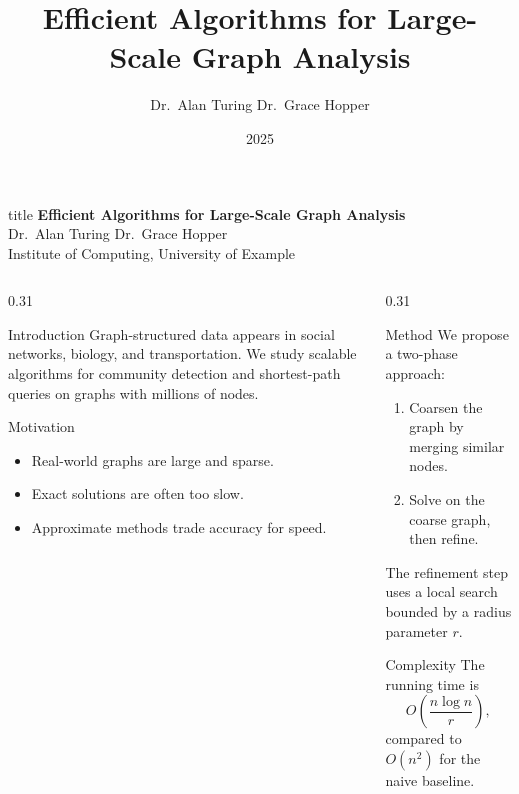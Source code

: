 \documentclass[final]{beamer}
\title{Efficient Algorithms for Large-Scale Graph Analysis}
\author{Dr.~Alan Turing \quad Dr.~Grace Hopper}
\institute{Institute of Computing, University of Example}
\date{2025}
\newcommand{\veryhuge}{\fontsize{60}{72}\selectfont}
\begin{document}
\begin{frame}[t]

\begin{beamercolorbox}[wd=\paperwidth, sep=1cm, center]{title}
  {\veryhuge\textbf{Efficient Algorithms for Large-Scale Graph Analysis}}\\[0.5cm]
  {\large Dr.~Alan Turing \quad Dr.~Grace Hopper}\\[0.2cm]
  {\normalsize Institute of Computing, University of Example \quad\textbar{}}
\end{beamercolorbox}
\vspace{1cm}

\begin{columns}[t]

\begin{column}{0.31\paperwidth}
  \begin{block}{Introduction}
    Graph-structured data appears in social networks, biology,
    and transportation. We study scalable algorithms for
    community detection and shortest-path queries on graphs
    with millions of nodes.
  \end{block}

  \begin{block}{Motivation}
    \begin{itemize}
      \item Real-world graphs are large and sparse.
      \item Exact solutions are often too slow.
      \item Approximate methods trade accuracy for speed.
    \end{itemize}
  \end{block}
\end{column}

\begin{column}{0.31\paperwidth}
  \begin{block}{Method}
    We propose a two-phase approach:
    \begin{enumerate}
      \item Coarsen the graph by merging similar nodes.
      \item Solve on the coarse graph, then refine.
    \end{enumerate}
    The refinement step uses a local search bounded by
    a radius parameter $r$.
  \end{block}

  \begin{block}{Complexity}
    The running time is
    \[
      O\!\left(\frac{n \log n}{r}\right),
    \]
    compared to $O(n^2)$ for the naive baseline.
  \end{block}
\end{column}


\end{columns}
\end{frame}
\end{document}
